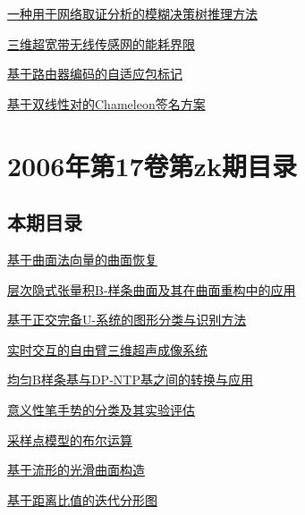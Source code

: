 \documentclass[a4paper]{article}
\begin{document}
\href{http://www.jos.org.cn/ch/reader/download_pdf.aspx?file_no=20071025&year_id=2007&quarter_id=10&falg=1}{一种用于网络取证分析的模糊决策树推理方法}

\href{http://www.jos.org.cn/ch/reader/download_pdf.aspx?file_no=20071026&year_id=2007&quarter_id=10&falg=1}{三维超宽带无线传感网的能耗界限}

\href{http://www.jos.org.cn/ch/reader/download_pdf.aspx?file_no=20071027&year_id=2007&quarter_id=10&falg=1}{基于路由器编码的自适应包标记}

\href{http://www.jos.org.cn/ch/reader/download_pdf.aspx?file_no=20071028&year_id=2007&quarter_id=10&falg=1}{基于双线性对的Chameleon签名方案}


\section{\textbf{2006年第17卷第zk期目录}}
\subsection{本期目录}
\href{http://www.jos.org.cn/ch/reader/download_pdf.aspx?file_no=2006s101&year_id=2006&quarter_id=zk&falg=1}{基于曲面法向量的曲面恢复}

\href{http://www.jos.org.cn/ch/reader/download_pdf.aspx?file_no=2006s102&year_id=2006&quarter_id=zk&falg=1}{层次隐式张量积B-样条曲面及其在曲面重构中的应用}

\href{http://www.jos.org.cn/ch/reader/download_pdf.aspx?file_no=2006s103&year_id=2006&quarter_id=zk&falg=1}{基于正交完备U-系统的图形分类与识别方法}

\href{http://www.jos.org.cn/ch/reader/download_pdf.aspx?file_no=2006s104&year_id=2006&quarter_id=zk&falg=1}{实时交互的自由臂三维超声成像系统}

\href{http://www.jos.org.cn/ch/reader/download_pdf.aspx?file_no=2006s105&year_id=2006&quarter_id=zk&falg=1}{均匀B样条基与DP-NTP基之间的转换与应用}

\href{http://www.jos.org.cn/ch/reader/download_pdf.aspx?file_no=2006s106&year_id=2006&quarter_id=zk&falg=1}{意义性笔手势的分类及其实验评估}

\href{http://www.jos.org.cn/ch/reader/download_pdf.aspx?file_no=2006s107&year_id=2006&quarter_id=zk&falg=1}{采样点模型的布尔运算}

\href{http://www.jos.org.cn/ch/reader/download_pdf.aspx?file_no=2006s108&year_id=2006&quarter_id=zk&falg=1}{基于流形的光滑曲面构造}

\href{http://www.jos.org.cn/ch/reader/download_pdf.aspx?file_no=2006s109&year_id=2006&quarter_id=zk&falg=1}{基于距离比值的迭代分形图}
\end{document}
